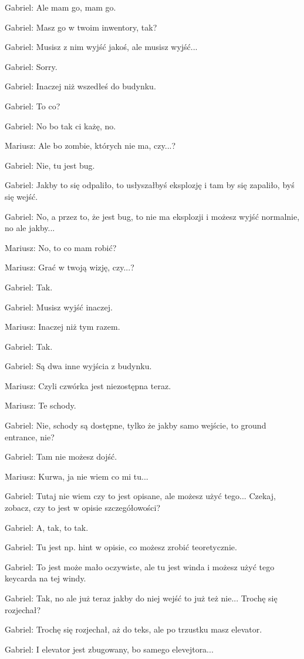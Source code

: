 Gabriel: Ale mam go, mam go.

Gabriel: Masz go w twoim inwentory, tak?

Gabriel: Musisz z nim wyjść jakoś, ale musisz wyjść...

Gabriel: Sorry.

Gabriel: Inaczej niż wszedłeś do budynku.

Gabriel: To co?

Gabriel: No bo tak ci każę, no.

Mariusz: Ale bo zombie, których nie ma, czy...?

Gabriel: Nie, tu jest bug.

Gabriel: Jakby to się odpaliło, to usłyszałbyś eksplozję i tam by się zapaliło, byś się wejść.

Gabriel: No, a przez to, że jest bug, to nie ma eksplozji i możesz wyjść normalnie, no ale jakby...

Mariusz: No, to co mam robić?

Mariusz: Grać w twoją wizję, czy...?

Gabriel: Tak.

Gabriel: Musisz wyjść inaczej.

Mariusz: Inaczej niż tym razem.

Gabriel: Tak.

Gabriel: Są dwa inne wyjścia z budynku.

Mariusz: Czyli czwórka jest niezostępna teraz.

Mariusz: Te schody.

Gabriel: Nie, schody są dostępne, tylko że jakby samo wejście, to ground entrance, nie?

Gabriel: Tam nie możesz dojść.

Mariusz: Kurwa, ja nie wiem co mi tu...

Gabriel: Tutaj nie wiem czy to jest opisane, ale możesz użyć tego... Czekaj, zobacz, czy to jest w opisie szczegółowości?

Gabriel: A, tak, to tak.

Gabriel: Tu jest np. hint w opisie, co możesz zrobić teoretycznie.

Gabriel: To jest może mało oczywiste, ale tu jest winda i możesz użyć tego keycarda na tej windy.

Gabriel: Tak, no ale już teraz jakby do niej wejść to już też nie... Trochę się rozjechał?

Gabriel: Trochę się rozjechał, aż do teks, ale po trzustku masz elevator.

Gabriel: I elevator jest zbugowany, bo samego elevejtora...

